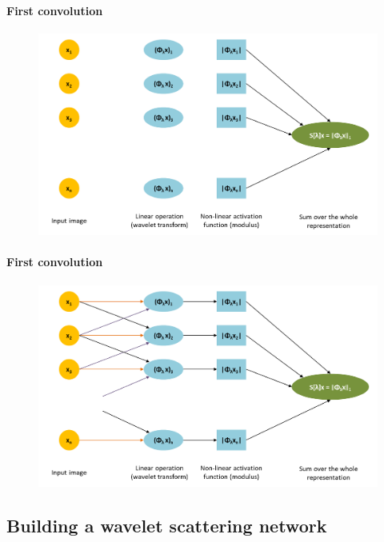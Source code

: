 \documentclass[10pt]{beamer}
\begin{document}
\begin{darkframes}
    \begin{frame}{\subsecname}
    \framesubtitle{First convolution}
    \begin{figure}
        \centering
        \includegraphics[width=\textwidth]{resources/convolution/CNN5.png}
    \end{figure}
    \end{frame}
    
    \begin{frame}{\subsecname}
    \framesubtitle{First convolution}
    \begin{figure}
        \centering
        \includegraphics[width=\textwidth]{resources/convolution/CNN0.png}
    \end{figure}
    \end{frame}
    
    \subsection{Building a wavelet scattering network}
    

\end{darkframes}
\end{document}
